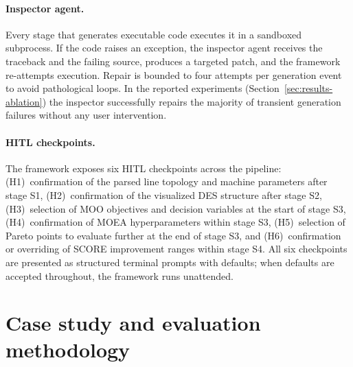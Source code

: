 \documentclass[a4paper,fleqn]{cas-sc}
\begin{document}
  \paragraph{Inspector agent.} Every stage that generates executable code executes it in a sandboxed subprocess. If the 
  code raises an exception, the inspector agent receives the traceback and the failing source, produces a targeted
  patch, and the framework re-attempts execution. Repair is bounded to four attempts per generation event to avoid      
  pathological loops. In the reported experiments (Section~\ref{sec:results-ablation}) the inspector successfully
  repairs the majority of transient generation failures without any user intervention.

  \paragraph{HITL checkpoints.} The framework exposes six HITL checkpoints across the pipeline: (H1)~confirmation of the parsed line topology and machine parameters after stage S1, (H2)~confirmation of the visualized DES structure after stage S2, (H3)~selection of MOO objectives and decision variables at the start of stage S3, (H4)~confirmation of MOEA  hyperparameters within stage S3, (H5)~selection of Pareto points to evaluate further at the end of stage S3, and (H6)~confirmation or overriding of SCORE improvement ranges within stage S4. All six checkpoints are presented as structured terminal prompts with defaults; when defaults are accepted throughout, the framework runs unattended. %

                                                            
                                                                                                                        
  \section{Case study and evaluation methodology}\label{sec:case}                                                       
                                                                                                                        
\end{document}
